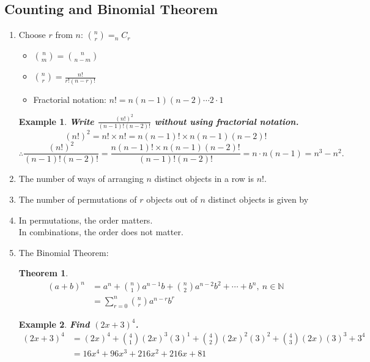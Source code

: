 \documentclass[12pt, a4paper]{article}
\newtheorem{theorem}{Theorem}[subsection]
\newtheorem{example}{Example}[subsection]
\begin{document}
\subsection{Counting and Binomial Theorem}
\begin{enumerate}
  \item Choose $r$ from $n$: {\color{red}$\binom{n}{r}=_nC_r$}
  \begin{itemize}
    \item {\color{red}$\binom{n}{m}=\binom{n}{n-m}$}
    \item {\color{red}$\binom{n}{r}=\frac{n!}{r!(n-r)!}$}
    \item Fractorial notation: $n!=n(n-1)(n-2)\cdots 2\cdot 1$\\
  \end{itemize}
  \begin{example}
    \textbf{Write $\frac{(n!)^2}{(n-1)!(n-2)!}$ without using fractorial notation.}
    $$(n!)^2=n!\times n!=n(n-1)!\times n(n-1)(n-2)!$$
    $$\therefore \frac{(n!)^2}{(n-1)!(n-2)!}=\frac{n(n-1)!\times n(n-1)(n-2)!}{(n-1)!(n-2)!}=n\cdot n(n-1)=n^3-n^2.$$
  \end{example}
  \item The number of ways of arranging $n$ distinct objects in a row is {\color{red}$n!$}.
  \item The number of permutations of $r$ objects out of $n$ distinct objects is given by {}
  \item In permutations, the order matters.\\ In combinations, the order does not matter.
  \item The Binomial Theorem: 
  \begin{theorem}
    {\color{red}$$\begin{aligned}
      (a+b)^n&=a^n+\binom{n}{1}a^{n-1}b+\binom{n}{2}a^{n-2}b^2+\cdots +b^n,\ n\in\mathbb{N}\\
      &=\sum\limits_{r=0}^n\binom{n}{r}a^{n-r}b^r
    \end{aligned}$$}
  \end{theorem}
  \begin{example}
    \textbf{Find $(2x+3)^4$.}
    $$\begin{aligned}
      (2x+3)^4&=(2x)^4+\binom{4}{1}(2x)^{3}(3)^1+\binom{4}{2}(2x)^{2}(3)^2+\binom{4}{3}(2x)(3)^3+3^4\\
      &=16x^4+96x^3+216x^2+216x+81

\end{aligned}$$
\end{example}
\end{enumerate}
\end{document}
